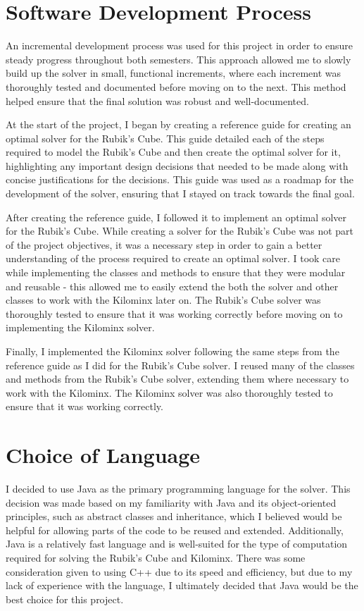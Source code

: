 \section{Software Development Process}
An incremental development process was used for this project in order to ensure steady progress throughout both semesters. This approach allowed me to slowly build up the solver in small, functional increments, where each increment was thoroughly tested and documented before moving on to the next. This method helped ensure that the final solution was robust and well-documented.

At the start of the project, I began by creating a reference guide for creating an optimal solver for the Rubik's Cube. This guide detailed each of the steps required to model the Rubik's Cube and then create the optimal solver for it, highlighting any important design decisions that needed to be made along with concise justifications for the decisions. This guide was used as a roadmap for the development of the solver, ensuring that I stayed on track towards the final goal.

After creating the reference guide, I followed it to implement an optimal solver for the Rubik's Cube. While creating a solver for the Rubik's Cube was not part of the project objectives, it was a necessary step in order to gain a better understanding of the process required to create an optimal solver. I took care while implementing the classes and methods to ensure that they were modular and reusable - this allowed me to easily extend the both the solver and other classes to work with the Kilominx later on. The Rubik's Cube solver was thoroughly tested to ensure that it was working correctly before moving on to implementing the Kilominx solver.

Finally, I implemented the Kilominx solver following the same steps from the reference guide as I did for the Rubik's Cube solver. I reused many of the classes and methods from the Rubik's Cube solver, extending them where necessary to work with the Kilominx. The Kilominx solver was also thoroughly tested to ensure that it was working correctly.

\section{Choice of Language}
I decided to use Java as the primary programming language for the solver. This decision was made based on my familiarity with Java and its object-oriented principles, such as abstract classes and inheritance, which I believed would be helpful for allowing parts of the code to be reused and extended. Additionally, Java is a relatively fast language and is well-suited for the type of computation required for solving the Rubik's Cube and Kilominx. There was some consideration given to using C++ due to its speed and efficiency, but due to my lack of experience with the language, I ultimately decided that Java would be the best choice for this project.
